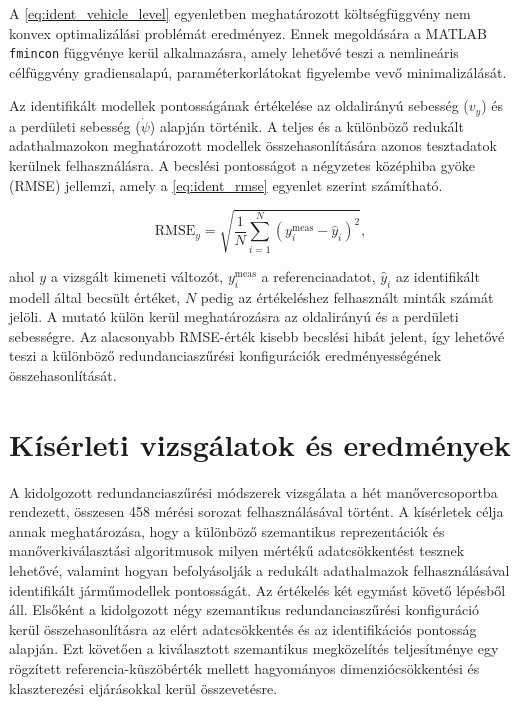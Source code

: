 \documentclass[12pt,a4paper,onehalfspacing, oneside]{book} %
\begin{document}
A \ref{eq:ident_vehicle_level} egyenletben meghatározott költségfüggvény nem konvex optimalizálási problémát eredményez. Ennek megoldására a MATLAB \texttt{fmincon} függvénye kerül alkalmazásra, amely lehetővé teszi a nemlineáris célfüggvény gradiensalapú, paraméterkorlátokat figyelembe vevő minimalizálását.

Az identifikált modellek pontosságának értékelése az oldalirányú sebesség ($v_y$) és a perdületi sebesség ($\dot{\psi}$) alapján történik. A teljes és a különböző redukált adathalmazokon meghatározott modellek összehasonlítására azonos tesztadatok kerülnek felhasználásra. A becslési pontosságot a négyzetes középhiba gyöke (RMSE) jellemzi, amely a \ref{eq:ident_rmse} egyenlet szerint számítható.

\begin{equation}
    \mathrm{RMSE}_y = \sqrt{\frac{1}{N}\sum_{i=1}^{N}\left(y_i^{\mathrm{meas}}-\hat{y}_i\right)^2},
    \label{eq:ident_rmse}
\end{equation}

ahol $y$ a vizsgált kimeneti változót, $y_i^{\mathrm{meas}}$ a referenciaadatot, $\hat{y}_i$ az identifikált modell által becsült értéket, $N$ pedig az értékeléshez felhasznált minták számát jelöli. A mutató külön kerül meghatározásra az oldalirányú és a perdületi sebességre. Az alacsonyabb RMSE-érték kisebb becslési hibát jelent, így lehetővé teszi a különböző redundanciaszűrési konfigurációk eredményességének összehasonlítását.

\chapter{Kísérleti vizsgálatok és eredmények}\label{ch:kiserleti_eredmenyek}
A kidolgozott redundanciaszűrési módszerek vizsgálata a hét manővercsoportba rendezett, összesen 458 mérési sorozat felhasználásával történt. A kísérletek célja annak meghatározása, hogy a különböző szemantikus reprezentációk és manőverkiválasztási algoritmusok milyen mértékű adatcsökkentést tesznek lehetővé, valamint hogyan befolyásolják a redukált adathalmazok felhasználásával identifikált járműmodellek pontosságát. Az értékelés két egymást követő lépésből áll. Elsőként a kidolgozott négy szemantikus redundanciaszűrési konfiguráció kerül összehasonlításra az elért adatcsökkentés és az identifikációs pontosság alapján. Ezt követően a kiválasztott szemantikus megközelítés teljesítménye egy rögzített referencia-küszöbérték mellett hagyományos dimenziócsökkentési és klaszterezési eljárásokkal kerül összevetésre.
\end{document}
